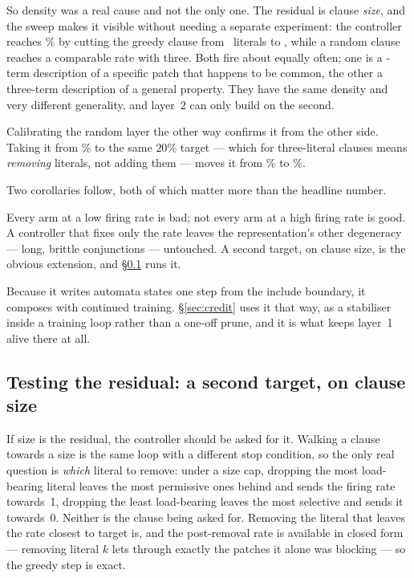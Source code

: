 So density was a real cause and not the only one. The residual is clause \emph{size}, and the
sweep makes it visible without needing a separate experiment: the controller reaches
\calibFireMctmCalibRTwoZero{}\% by cutting the greedy clause from \densityGreedySize\ literals to
\calibSizeMctmCalibRTwoZero, while a random clause reaches a comparable rate with three. Both fire about equally often; one is a
\calibSizeMctmCalibRTwoZero-term description of a specific patch that happens to be common,
the other a three-term description of a general property. They have the same density and very different generality, and layer~2
can only build on the second.

Calibrating the random layer the other way confirms it from the other side. Taking it from
\fireRandomPre{}\% to the same $20\%$ target --- which for three-literal clauses means
\emph{removing} literals, not adding them --- moves it from \accMctmRandom{}\% to
\accMctmRandomCalib{}\%.

Two corollaries follow, both of which matter more than the headline number.

 Every arm at a low firing rate is bad; not
every arm at a high firing rate is good. A controller that fixes only the rate leaves the
representation's other degeneracy --- long, brittle conjunctions --- untouched. A second
target, on clause size, is the obvious extension, and \S\ref{sec:sizetarget} runs it.

 Because it writes automata states one
step from the include boundary, it composes with continued training. \S\ref{sec:credit} uses
it that way, as a stabiliser inside a training loop rather than a one-off prune, and it is
what keeps layer~1 alive there at all.

\subsection{Testing the residual: a second target, on clause size}
\label{sec:sizetarget}

If size is the residual, the controller should be asked for it. Walking a clause towards a
size is the same loop with a different stop condition, so the only real question is
\emph{which} literal to remove: under a size cap, dropping the most load-bearing literal
leaves the most permissive ones behind and sends the firing rate towards~1, dropping the least
load-bearing leaves the most selective and sends it towards~0. Neither is the clause being
asked for. Removing the literal that leaves the rate closest to target is, and the
post-removal rate is available in closed form --- removing literal $k$ lets through exactly
the patches it alone was blocking --- so the greedy step is exact.


